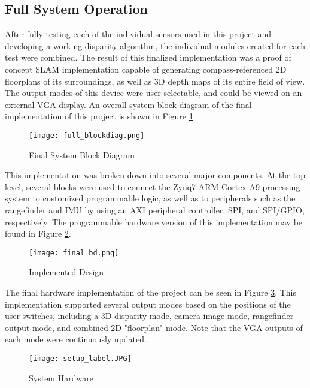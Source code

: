 \subsection{Full System Operation}
After fully testing each of the individual sensors used in this project and developing a working disparity algorithm, the individual modules created for each test were combined. The result of this finalized implementation was a proof of concept SLAM implementation capable of generating compass-referenced 2D floorplans of its surroundings, as well as 3D depth maps of its entire field of view. The output modes of this device were user-selectable, and could be viewed on an external VGA display. An overall system block diagram of the final implementation of this project is shown in Figure \ref{systemBD2}.

\begin{figure}[H] 
	\centerline{
	\texttt{[image: full\_blockdiag.png]}
	}
	\caption{Final System Block Diagram}
	\label{systemBD2}
\end{figure}

This implementation was broken down into several major components. At the top level, several blocks were used to connect the Zynq7 ARM Cortex A9 processing system to customized programmable logic, as well as to peripherals such as the rangefinder and IMU by using an AXI peripheral controller, SPI, and SPI/GPIO, respectively. The programmable hardware version of this implementation may be found in Figure \ref{finalBD}.

\begin{figure}[H] 
	\centerline{
	\texttt{[image: final\_bd.png]}
	}
	\caption{Implemented Design}
	\label{finalBD}
\end{figure}

The final hardware implementation of the project can be seen in Figure \ref{finalHW}. This implementation supported several output modes based on the positions of the user switches, including a 3D disparity mode, camera image mode, rangefinder output mode, and combined 2D "floorplan" mode. Note that the VGA outputs of each mode were continuously updated. 

\begin{figure}[H]  
 	\centerline{
	\texttt{[image: setup\_label.JPG]}
	}
	\caption{System Hardware}
	\label{finalHW}
\end{figure}

